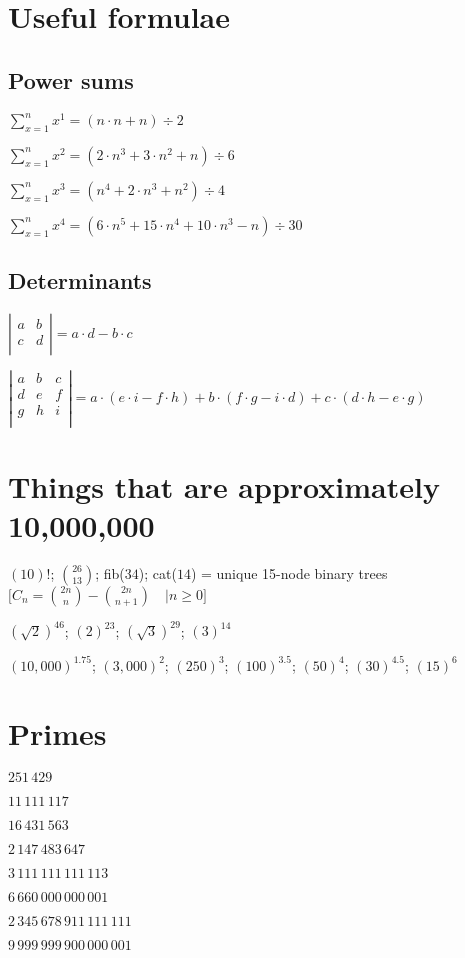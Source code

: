 \section {Useful formulae}

  \subsection {Power sums}
    $ {\sum^n_{x=1} x^1} = (n \cdot n + n) \div 2 $

    $ {\sum^n_{x=1} x^2} = (2 \cdot n^3 + 3 \cdot n^2 + n) \div 6 $

    $ {\sum^n_{x=1} x^3} = (n^4 + 2 \cdot n^3 + n^2) \div 4 $

    $ {\sum^n_{x=1} x^4} = (6 \cdot n^5 + 15 \cdot n^4 + 10 \cdot n^3 - n) \div 30 $

  \subsection {Determinants}
    $ \left| \begin{array}{cc} a & b \\ c & d \\ \end{array} \right| = a \cdot d - b \cdot c $

    $ \left| \begin{array}{ccc} a & b & c \\ d & e & f \\ g & h & i \\ \end{array} \right| = a \cdot (e \cdot i - f \cdot h) + b \cdot (f \cdot g - i \cdot d) + c \cdot (d \cdot h - e \cdot g) $

\section {Things that are approximately 10,000,000}

  $ (10)! $;
  $ {26} \choose {13} $;
    fib($ 34 $);
    cat($ 14 $) = unique 15-node binary trees $ \Big[ C_n = {2n \choose n} - {2n\choose n+1} \quad | n \ge 0 \Big] $

  $ (\sqrt{2})^{46} $;
  $ (2)^{23} $;
  $ (\sqrt{3})^{29} $;
  $ (3)^{14} $

  $ (10,000)^{1.75} $;
  $ (3,000)^{2} $;
  $ (250)^{3} $;
  $ (100)^{3.5} $;
  $ (50)^{4} $;
  $ (30)^{4.5} $;
  $ (15)^{6} $

\section {Primes}
  $251\,429$

  $11\,111\,117$

  $16\,431\,563$

  $2\,147\,483\,647$

  $3\,111\,111\,111\,113$

  $6\,660\,000\,000\,001$

  $2\,345\,678\,911\,111\,111$

  $9\,999\,999\,900\,000\,001$
